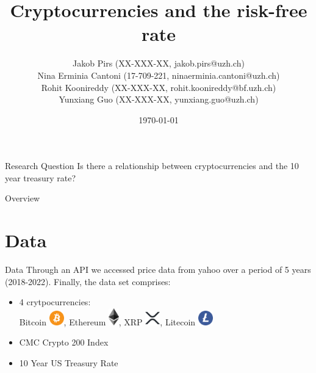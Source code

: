 \documentclass[11pt]{beamer}
\author{\small Jakob Pirs (XX-XXX-XX, jakob.pirs@uzh.ch)\\
Nina Erminia Cantoni (17-709-221, ninaerminia.cantoni@uzh.ch)\\
Rohit Koonireddy (XX-XXX-XX, rohit.koonireddy@bf.uzh.ch)\\
Yunxiang Guo (XX-XXX-XX, yunxiang.guo@uzh.ch)\\}
\title{Cryptocurrencies and the risk-free rate}
\institute[]{University of Zurich, Department of Banking and Finance}
\date{\today}
\begin{document}
\begin{frame}
\titlepage
\end{frame}


\begin{frame}{Research Question}
 \centering Is there a relationship between cryptocurrencies and the 10 year treasury rate?
\end{frame}

\begin{frame}{Overview}
\tableofcontents 
\end{frame}


\section{Data}
\begin{frame}{Data}
Through an API we accessed price data from yahoo over a period of 5 years (2018-2022). Finally, the data set comprises:
 \begin{itemize}
        \item 4 crytpocurrencies: \\
        Bitcoin \includegraphics[width=0.05\textwidth]{images/Bitcoin.png}, Ethereum \includegraphics[width=0.035\textwidth]{images/ETH.png}, XRP \includegraphics[width=0.05\textwidth]{images/XRP.png}, Litecoin \includegraphics[width=0.05\textwidth]{images/LTC.png}
        
        \medskip
        
        \item CMC Crypto 200 Index
        
        \medskip
        
        \item 10 Year US Treasury Rate
    \end{itemize}

\end{frame}
\end{document}
